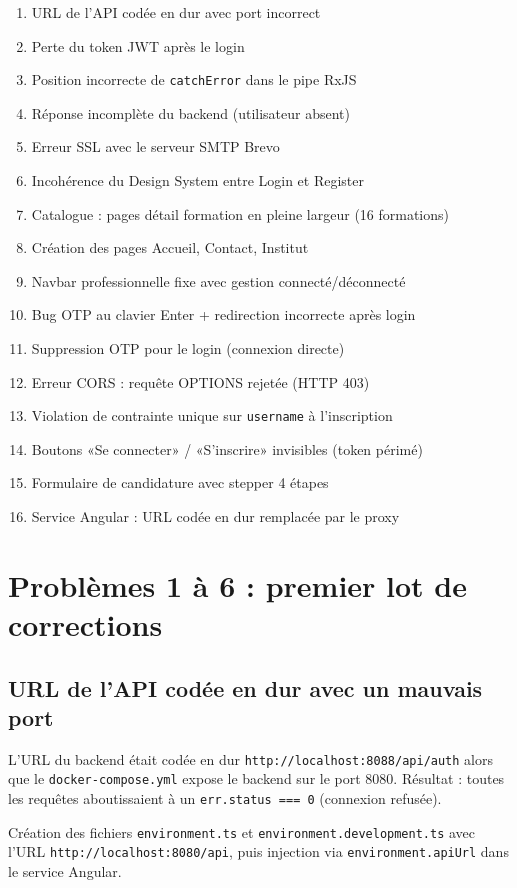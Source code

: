 \documentclass[a4paper,12pt,french]{article}
\begin{document}
\begin{enumerate}
    \item URL de l'API codée en dur avec port incorrect
    \item Perte du token JWT après le login
    \item Position incorrecte de \texttt{catchError} dans le pipe RxJS
    \item Réponse incomplète du backend (utilisateur absent)
    \item Erreur SSL avec le serveur SMTP Brevo
    \item Incohérence du Design System entre Login et Register
    \item Catalogue : pages détail formation en pleine largeur (16 formations)
    \item Création des pages Accueil, Contact, Institut
    \item Navbar professionnelle fixe avec gestion connecté/déconnecté
    \item Bug OTP au clavier Enter + redirection incorrecte après login
    \item Suppression OTP pour le login (connexion directe)
    \item Erreur CORS : requête OPTIONS rejetée (HTTP 403)
    \item Violation de contrainte unique sur \texttt{username} à l'inscription
    \item Boutons «Se connecter» / «S'inscrire» invisibles (token périmé)
    \item Formulaire de candidature avec stepper 4 étapes
    \item Service Angular : URL codée en dur remplacée par le proxy
\end{enumerate}

\newpage

\section{Problèmes 1 à 6 : premier lot de corrections}

\subsection{URL de l'API codée en dur avec un mauvais port}
\begin{problembox}
L'URL du backend était codée en dur \texttt{http://localhost:8088/api/auth} alors que le \texttt{docker-compose.yml} expose le backend sur le port 8080. Résultat : toutes les requêtes aboutissaient à un \texttt{err.status === 0} (connexion refusée).
\end{problembox}
\begin{solutionbox}
Création des fichiers \texttt{environment.ts} et \texttt{environment.development.ts} avec l'URL \texttt{http://localhost:8080/api}, puis injection via \texttt{environment.apiUrl} dans le service Angular.
\end{solutionbox}
\end{document}
